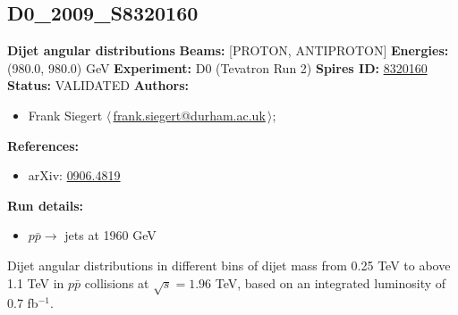\subsection[D0\_2009\_S8320160]{D0\_2009\_S8320160\,\cite{:2009mh}}
\textbf{Dijet angular distributions}\newline
\textbf{Beams:} [PROTON, ANTIPROTON] \newline
\textbf{Energies:} (980.0, 980.0) GeV \newline
\textbf{Experiment:} D0 (Tevatron Run 2) \newline
\textbf{Spires ID:} \href{http://www.slac.stanford.edu/spires/find/hep/www?rawcmd=key+8320160}{8320160}\newline
\textbf{Status:} VALIDATED\newline
\textbf{Authors:}
\begin{itemize}
  \item Frank Siegert $\langle\,$\href{mailto:frank.siegert@durham.ac.uk}{frank.siegert@durham.ac.uk}$\,\rangle$;
\end{itemize}
\textbf{References:}
\begin{itemize}
  \item arXiv: \href{http://arxiv.org/abs/0906.4819}{0906.4819}
\end{itemize}
\textbf{Run details:}
\begin{itemize}

  \item $p \bar{p} \to$ jets at 1960 GeV\end{itemize}

\noindent Dijet angular distributions in different bins of dijet mass from 0.25 TeV to above 1.1 TeV in $p \bar{p}$ collisions at $\sqrt{s} = 1.96$ TeV, based on an integrated luminosity of 0.7 fb$^{-1}$.

\clearpage


\clearpage

